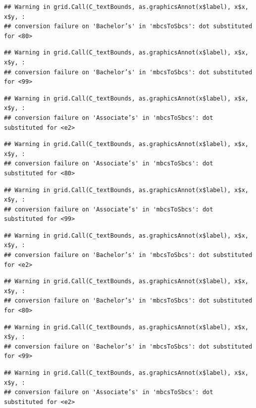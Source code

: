 \documentclass[
]{article}
\begin{document}
\begin{verbatim}
## Warning in grid.Call(C_textBounds, as.graphicsAnnot(x$label), x$x, x$y, :
## conversion failure on 'Bachelor’s' in 'mbcsToSbcs': dot substituted for <80>
\end{verbatim}

\begin{verbatim}
## Warning in grid.Call(C_textBounds, as.graphicsAnnot(x$label), x$x, x$y, :
## conversion failure on 'Bachelor’s' in 'mbcsToSbcs': dot substituted for <99>
\end{verbatim}

\begin{verbatim}
## Warning in grid.Call(C_textBounds, as.graphicsAnnot(x$label), x$x, x$y, :
## conversion failure on 'Associate’s' in 'mbcsToSbcs': dot substituted for <e2>
\end{verbatim}

\begin{verbatim}
## Warning in grid.Call(C_textBounds, as.graphicsAnnot(x$label), x$x, x$y, :
## conversion failure on 'Associate’s' in 'mbcsToSbcs': dot substituted for <80>
\end{verbatim}

\begin{verbatim}
## Warning in grid.Call(C_textBounds, as.graphicsAnnot(x$label), x$x, x$y, :
## conversion failure on 'Associate’s' in 'mbcsToSbcs': dot substituted for <99>
\end{verbatim}

\begin{verbatim}
## Warning in grid.Call(C_textBounds, as.graphicsAnnot(x$label), x$x, x$y, :
## conversion failure on 'Bachelor’s' in 'mbcsToSbcs': dot substituted for <e2>
\end{verbatim}

\begin{verbatim}
## Warning in grid.Call(C_textBounds, as.graphicsAnnot(x$label), x$x, x$y, :
## conversion failure on 'Bachelor’s' in 'mbcsToSbcs': dot substituted for <80>
\end{verbatim}

\begin{verbatim}
## Warning in grid.Call(C_textBounds, as.graphicsAnnot(x$label), x$x, x$y, :
## conversion failure on 'Bachelor’s' in 'mbcsToSbcs': dot substituted for <99>
\end{verbatim}

\begin{verbatim}
## Warning in grid.Call(C_textBounds, as.graphicsAnnot(x$label), x$x, x$y, :
## conversion failure on 'Associate’s' in 'mbcsToSbcs': dot substituted for <e2>
\end{verbatim}
\end{document}
